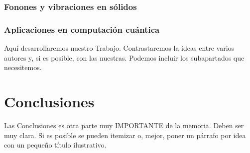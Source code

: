 \documentclass[11pt,a4paper,spanish]{book}
\begin{document}
\subsection{Fonones y vibraciones en sólidos}
\subsection{Aplicaciones en computación cuántica}


Aquí desarrollaremos nuestro Trabajo. Contrastaremos la ideas entre varios autores y, si es posible, con las nuestras. Podemos incluir los subapartados que necesitemos.

\chapter{Conclusiones}

Las Conclusiones es otra parte muy IMPORTANTE de la memoria. Deben ser muy clara. Si es posible se pueden itemizar o, mejor, poner un párrafo por idea con un pequeño título ilustrativo.
\end{document}
